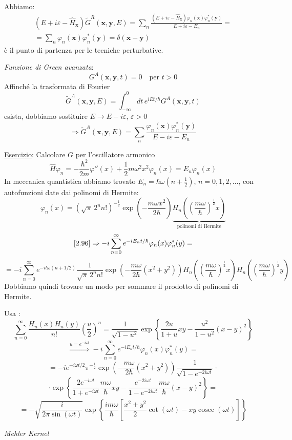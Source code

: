 \documentclass[a4paper,11pt]{report}
\newcommand{\x}{\boldsymbol{x}}
\newcommand{\y}{\boldsymbol{y}}
\begin{document}
Abbiamo:
\begin{equation}
\begin{gathered}
(E + i\varepsilon - \hat{H}_{\x})\tilde{G}^R(\x,\y,E)=\sum_n \frac{(E + i\varepsilon - \hat{H}_{\x}) \varphi_n(\x)\varphi_n^*(\y)}{E + i\varepsilon - E_n} =\\
= \sum_n \varphi_n(\x)\varphi_n^*(\y)=\delta(\x-\y)
\end{gathered}
\end{equation}
\`e il punto di partenza per le tecniche perturbative.

\medskip

\emph{Funzione di Green avanzata}: 
\[
G^A(\x,\y,t)=0 \quad \text{per } t>0
\]
Affinch\'e la trasformata di Fourier
\[
\tilde{G}^A(\x,\y,E)=\int_{-\infty}^0 dt\, e^{iEt/\hbar}G^A(\x,\y,t)
\]
esista, dobbiamo sostituire $E\to E-i\varepsilon$, $\varepsilon >0$
\[
\Rightarrow\tilde{G}^A(\x,\y,E)=\sum_n \frac{\varphi_n(\x)\varphi_n^*(\y)}{E - i\varepsilon - E_n}
\]

\medskip

\underline{Esercizio}: Calcolare $G$ per l'oscillatore armonico
\[
\hat{H}\varphi_n = -\frac{\hbar^2}{2m}\varphi''(x) + \frac{1}{2}m\omega^2 x^2 \varphi_n(x)=E_n\varphi_n(x)
\]
In meccanica quantistica abbiamo trovato $E_n=\hbar\omega\left(n+\frac{1}{2}\right)$, $n=0,1,2,\dots $, con autofunzioni date dai polinomi di Hermite:
\[
\varphi_n(x)=(\sqrt{\pi}\,2^n n!)^{-\frac{1}{2}}\exp\left(-\frac{m\omega x^2}{2\hbar}\right) \underbrace{H_n\left(\left(\frac{m\omega}{\hbar}\right)^{\frac{1}{2}}x\right)}_\text{polinomi di Hermite}
\]
\[
\eqref{2.96} \Rightarrow -i\sum_{n=0}^\infty e^{-iE_n t/\hbar}\varphi_n(x)\varphi_n^*(y)=
\]
\[
=-i\sum_{n=0}^\infty e^{-i t\omega(n+1/2)} \frac{1}{\sqrt{\pi} \, 2^n n!} \exp\left(-\frac{m\omega}{2\hbar}(x^2+y^2)\right) H_n\left(\left(\frac{m\omega}{\hbar}\right)^{\frac{1}{2}}x\right)H_n\left(\left(\frac{m\omega}{\hbar}\right)^{\frac{1}{2}}y\right)
\]
Dobbiamo quindi trovare un modo per sommare il prodotto di polinomi di Hermite.

Usa :
\begin{equation}
\sum_{n=0}^\infty \frac{H_n (x)H_n (y)}{n!} \left(\frac{u}{2}\right)^n=\frac{1}{\sqrt{1-u^2}}\exp \left\{ \frac{2u}{1+u}xy - \frac{u^2}{1-u^2}(x-y)^2 \right\}
\label{2.99}
\end{equation}
\[
\overset{u=e^{-i\omega t}}{\Rightarrow} -i\sum_{n=0}^\infty e^{-iE_n t/\hbar} \varphi_n(x)\varphi_n^*(y) = 
\]
\[
= -i e^{-i\omega t/2}\pi^{-\frac{1}{2}}\exp\left(-\frac{m\omega}{2\hbar}(x^2+y^2)\right)\frac{1}{\sqrt{1-e^{-2i\omega t}}}\cdot
\]
\[
\cdot\exp\left\{\frac{2e^{-i\omega t}}{1+e^{-i\omega t}} \frac{m\omega}{\hbar}xy - \frac{e^{-2i\omega t}}{1-e^{-2i\omega t}}\frac{m\omega}{\hbar}(x-y)^2\right\}=
\]
\begin{equation}
=-\sqrt{\frac{i}{2\pi\sin (\omega t)}}\exp\left\{ \frac{i m \omega}{\hbar}\left[\frac{x^2+y^2}{2}\cot (\omega t) - xy \operatorname{cosec} (\omega t) \right]\right\}
\label{2.100}
\end{equation}
\centerline{\emph{Mehler Kernel}}
\end{document}
